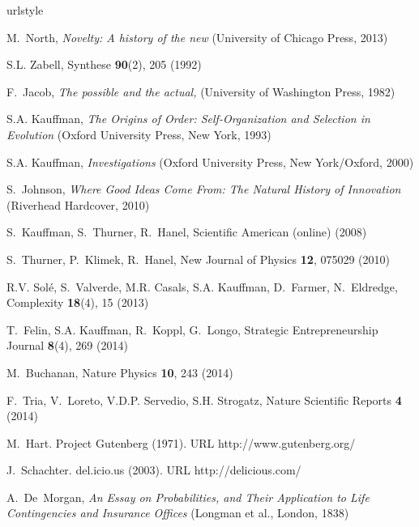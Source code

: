 \documentclass[graybox]{svmult}
\begin{document}
\begin{thebibliography}{10}
\providecommand{\url}[1]{{#1}}
\providecommand{\urlprefix}{URL }
\expandafter\ifx\csname urlstyle\endcsname\relax
  \providecommand{\doi}[1]{DOI \discretionary{}{}{}#1}\else
  \providecommand{\doi}{DOI \discretionary{}{}{}\begingroup
  \urlstyle{rm}\Url}\fi

M.~North, \emph{{Novelty: A history of the new}} (University of Chicago Press,
  2013)

S.L. Zabell, Synthese \textbf{90}(2), 205 (1992)

F.~Jacob, \emph{The possible and the actual,} (University of Washington Press,
  1982)

S.A. Kauffman, \emph{{The Origins of Order: Self-Organization and Selection in
  Evolution}} (Oxford University Press, New York, 1993)

S.A. Kauffman, \emph{Investigations} (Oxford University Press, New York/Oxford,
  2000)

S.~Johnson, \emph{Where Good Ideas Come From: The Natural History of
  Innovation} (Riverhead Hardcover, 2010)

S.~Kauffman, S.~Thurner, R.~Hanel, Scientific American (online)  (2008)

S.~Thurner, P.~Klimek, R.~Hanel, New Journal of Physics \textbf{12}, 075029
  (2010)

R.V. Sol\'e, S.~Valverde, M.R. Casals, S.A. Kauffman, D.~Farmer, N.~Eldredge,
  Complexity \textbf{18}(4), 15 (2013)

T.~Felin, S.A. Kauffman, R.~Koppl, G.~Longo, Strategic Entrepreneurship Journal
  \textbf{8}(4), 269 (2014)

M.~Buchanan, Nature Physics \textbf{10}, 243 (2014)

F.~Tria, V.~Loreto, V.D.P. Servedio, S.H. Strogatz, Nature Scientific Reports
  \textbf{4} (2014)

M.~Hart.
\newblock Project {G}utenberg (1971).
\newblock \urlprefix\url{http://www.gutenberg.org/}

J.~Schachter.
\newblock del.icio.us (2003).
\newblock \urlprefix\url{http://delicious.com/}

A.~De~Morgan, \emph{{An Essay on Probabilities, and Their Application to Life
  Contingencies and Insurance Offices}} (Longman et al., London, 1838)


\end{thebibliography}
\end{document}
